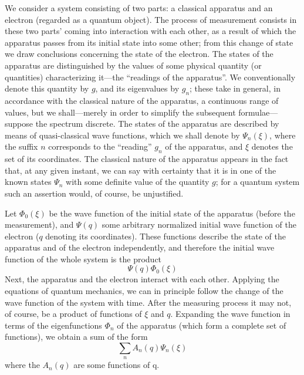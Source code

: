 We consider a system consisting of two parts: a classical apparatus and an electron (regarded as a quantum object). The process of measurement consists in these two parts’ coming into interaction with each other, as a result of which the apparatus passes from its initial state into some other; from this change of state we draw conclusions concerning the state of the electron. The states of the apparatus are distinguished by the values of some physical quantity (or quantities) characterizing it—the “readings of the apparatus”. We conventionally denote this quantity by $ g $, and its eigenvalues by $ g_n $; these take in general, in accordance with the classical nature of the apparatus, a continuous range of values, but we shall—merely in order to simplify the subsequent formulae—suppose the spectrum discrete. The states of the apparatus are described by means of quasi-classical wave functions, which we shall denote by $\Psi_n(\xi)$, where the suffix $ n $ corresponds to the “reading” $ g_n $ of the apparatus, and $\xi$ denotes the set of its coordinates. The classical nature of the apparatus appears in the fact that, at any given instant, we can say with certainty that it is in one of the known states $\Psi_n$ with some definite value of the quantity $ g $; for a quantum system such an assertion would, of course, be unjustified.
	
Let $\Phi_0(\xi)$ be the wave function of the initial state of the apparatus (before the measurement), and $ \Psi(q) $ some arbitrary normalized initial wave function of the electron ($ q $ denoting its coordinates). These functions describe the state of the apparatus and of the electron independently, and therefore the initial wave function of the whole system is the product
\begin{equation}\label{7.1}
\Psi(q)\Phi_0(\xi)
\end{equation}	
Next, the apparatus and the electron interact with each other. Applying the equations of quantum mechanics, we can in principle follow the change of the wave function of the system with time. After the measuring process it may not, of course, be a product of functions of $\xi$ and $ q $. Expanding the wave function in terms of the eigenfunctions $\Phi_n$ of the apparatus (which form a complete set of functions), we obtain a sum of the form
\begin{equation}\label{7.2}
\sum_{n}A_n(q)\Psi_n(\xi)
\end{equation}	
where the $ A_n(q) $ are some functions of q.
	
